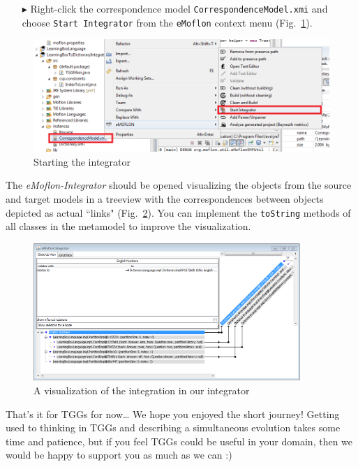 \begin{enumerate}
\item[$\blacktriangleright$] Right-click the correspondence model \texttt{Correspondence\-Model\-.xmi} and choose \texttt{Start Integrator} from the \texttt{eMoflon} context menu (Fig.~\ref{fig:startintegrator}).
\end{enumerate}

\begin{figure}[htbp]
\begin{center}
  \includegraphics[width=\textwidth]{pics/tggBilder/transformation/tgg29}
  \caption{Starting the integrator}  
  \label{fig:startintegrator}
\end{center}
\end{figure} 

The \emph{eMoflon-Integrator} should be opened visualizing the objects from the source and target models in a treeview with the correspondences between objects depicted as actual ``links" (Fig.~\ref{fig:emoflonintegrator}).
You can implement the \texttt{toString} methods of all classes in the metamodel to improve the visualization.

\begin{figure}[htbp]
\begin{center}
  \includegraphics[width=0.9\textwidth]{pics/tggBilder/transformation/tgg30}
  \caption{A visualization of the integration in our integrator}  
  \label{fig:emoflonintegrator}
\end{center}
\end{figure} 

That's it for TGGs for now\ldots 
We hope you enjoyed the short journey! 
Getting used to thinking in TGGs and describing a simultaneous evolution takes some time and patience, but if you feel TGGs could be useful in your domain, then we would be happy to support you as much as we can :)